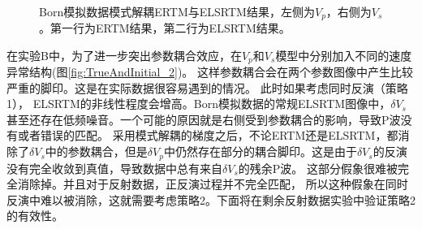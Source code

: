 \begin{figure}[!hbt]
   \centering
   \\
   \caption{Born模拟数据模式解耦ERTM与ELSRTM结果，左侧为$V_p$，右侧为$V_s$。第一行为ERTM结果，第二行为ELSRTM结果。}
   \label{fig:decomp_2}
\end{figure}
在实验B中，为了进一步突出参数耦合效应，在$V_p$和$V_s$模型中分别加入不同的速度异常结构(图\ref{fig:TrueAndInitial_2})。
这样参数耦合会在两个参数图像中产生比较严重的脚印。这是在实际数据很容易遇到的情况。
此时如果考虑同时反演（策略1），
ELSRTM的非线性程度会增高。Born模拟数据的常规ELSRTM图像中，$\delta
V_s$甚至还存在低频噪音。一个可能的原因就是右侧受到参数耦合的影响，导致P波没有或者错误的匹配。
采用模式解耦的梯度之后，不论ERTM还是ELSRTM，都消除了$\delta
V_s$中的参数耦合，但是$\delta
V_p$中仍然存在部分的耦合脚印。这是由于$\delta
V_s$的反演没有完全收敛到真值，导致数据中总有来自$\delta V_s$的残余P波。
这部分假象很难被完全消除掉。并且对于反射数据，正反演过程并不完全匹配，
所以这种假象在同时反演中难以被消除，这就需要考虑策略2。下面将在剩余反射数据实验中验证策略2的有效性。

